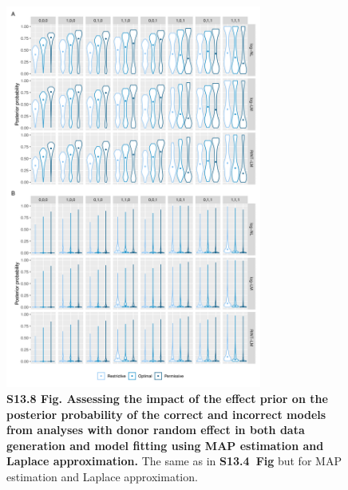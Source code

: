 \documentclass[11pt]{article}
\newcommand{\sfigppeffectfour}{\textbf{S13.4~Fig}\xspace}
\begin{document}
\begin{figure}[!ht]
\begin{center}
  \includegraphics[width=0.75\textwidth]{png/sim_vln_effect_map_lap_ranef_ranef.png}
\end{center}  
\caption{
  {\bf
    S13.8 Fig.
    Assessing the impact of the effect prior on the posterior probability of the correct and incorrect models from analyses with donor random effect in both data generation and model fitting using MAP estimation and Laplace approximation.}
The same as in \sfigppeffectfour but for MAP estimation and Laplace approximation.
}
\label{s-fig:sim-effect-map-ranef-ranef}
\end{figure}
\end{document}

